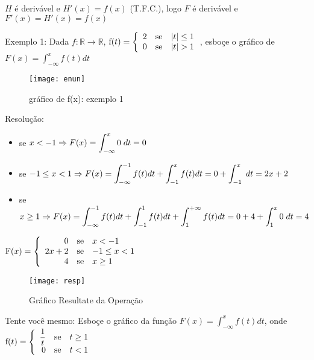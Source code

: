 \documentclass[12pt,openany]{book}
\begin{document}
$H$ é derivável e $H'(x) = f(x)$ (T.F.C.), logo $F$ é derivável e $F'(x)=H'(x)=f(x)$

\vspace{20pt}
Exemplo 1: Dada $f:\mathds{R}\rightarrow\mathds{R}$, $\hbox{f}(t)
= \left\{ \begin{array}{rll}
2 & \hbox{se} &  |t| \leq 1 \\
0 & \hbox{se} &  |t|  > 1 \\
\end{array}\right.$, esboçe o gráfico de $\displaystyle{F(x)=\int_{-\infty}^x f(t)dt}$
\begin{SCfigure}
\centering
\texttt{[image: enun]}
\caption{gráfico de f(x): exemplo 1}
\label{fig:en1}
\end{SCfigure}

Resolução:
\begin{itemize}
\item se $\displaystyle{x<-1 \Rightarrow F(x) = \int_{-\infty}^x 0\hspace{1mm}dt = 0}$
\item se $\displaystyle{ -1 \leq x < 1 \Rightarrow F(x) = \int_{-\infty}^{-1} f(t) dt + \int_{-1}^x f(t)dt = 0 + \int_{-1}^x \hspace{1mm}dt = 2x+2}$
\item se $\displaystyle{ x \geq 1 \Rightarrow F(x) = \int_{-\infty}^{-1} f(t) dt + \int_{-1}^1 f(t)dt + \int_1^{+\infty}f(t)dt = 0 + 4+ \int_1^x 0 \hspace{1mm}dt = 4}$
\end{itemize}

$\hbox{F}(x)
= \left\{ \begin{array}{rll}
0 & \hbox{se} &  x <-1 \\
2x+2 & \hbox{se} &  -1 \leq x < 1 \\
4 & \hbox{se} & x \geq 1 \\
\end{array}\right.$

\begin{figure}[h]
\centering
\texttt{[image: resp]}
\caption{Gráfico Resultate da Operação}
\label{fig:res1}
\end{figure}
\vspace{20pt}

\hspace{5mm}Tente você mesmo: Esboçe o gráfico da função $\displaystyle{F(x) = \int_{-\infty}^x f(t)dt}$, onde $\hbox{f}(t)
= \left\{ \begin{array}{rll}
\displaystyle{\frac{1}{t}} & \hbox{se} &  t \geq 1 \\
0 & \hbox{se} &  t < 1 \\
\end{array}\right.$
\end{document}
